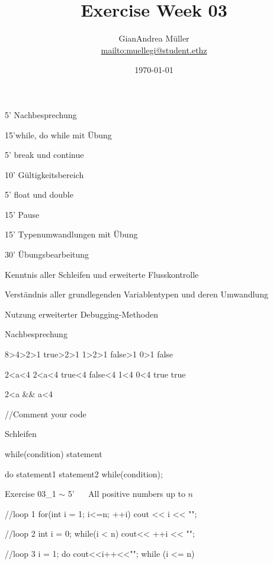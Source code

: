 \ifnum\conditionmacro=1 \documentclass[handout,usenames,dvipsnames]{beamer}\fi
\title{Exercise Week 03}
\author{GianAndrea Müller\\ \url{mailto:muellegi@student.ethz}}
\date{\today}
\begin{document}
\maketitle

\begin{TFTimeSchedule}
\item 5' Nachbesprechung 
\item 15'while, do while mit Übung
\item 5' break und continue
\item 10' Gültigkeitsbereich
\item 5' float und double
\item 15' Pause
\item 15' Typenumwandlungen mit Übung
\item 30' Übungsbearbeitung
\end{TFTimeSchedule}

\begin{TFLearningObjectives}
\item Kenntnis aller Schleifen und erweiterte Flusskontrolle
\item Verständnis aller grundlegenden Variablentypen und deren Umwandlung
\item Nutzung erweiterter Debugging-Methoden
\end{TFLearningObjectives}

\begin{frame}[fragile]{Nachbesprechung}
\begin{TFCpp}
8>4>2>1
true>2>1
1>2>1
false>1
0>1
false

2<a<4     2<a<4
true<4    false<4
1<4       0<4
true      true

2<a && a<4

//Comment your code
\end{TFCpp}
\end{frame}


\begin{frame}[fragile]{Schleifen}
\begin{TFCpp}
while(condition)
	statement


do{
	statement1
	statement2
}
while(condition);
\end{TFCpp}
\end{frame}

\begin{frame}[fragile]{Exercise 03\_1 $\sim$ 5' $\quad$ All positive numbers up to $n$}
\begin{TFCpp}
//loop 1
for(int i = 1; i<=n; ++i)
	cout << i << "\n";
	
//loop 2
int i = 0;
while(i < n)
	cout<< ++i << "\n";
	
//loop 3
i = 1;
do
	cout<<i++<<"\n";
while (i <= n)
\end{TFCpp}
\end{frame}
\end{document}
